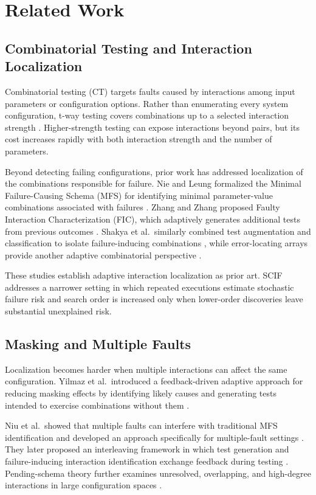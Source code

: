 \section{Related Work}

\subsection{Combinatorial Testing and Interaction Localization}

Combinatorial testing (CT) targets faults caused by interactions among input parameters or configuration options. Rather than enumerating every system configuration, t-way testing covers combinations up to a selected interaction strength \cite{kuhn2008beyond, nie2011survey}. Higher-strength testing can expose interactions beyond pairs, but its cost increases rapidly with both interaction strength and the number of parameters.

Beyond detecting failing configurations, prior work has addressed localization of the combinations responsible for failure. Nie and Leung formalized the Minimal Failure-Causing Schema (MFS) for identifying minimal parameter-value combinations associated with failures \cite{nie2011mfs}. Zhang and Zhang proposed Faulty Interaction Characterization (FIC), which adaptively generates additional tests from previous outcomes \cite{zhang2011fic}. Shakya et al.~similarly combined test augmentation and classification to isolate failure-inducing combinations \cite{shakya2012isolating}, while error-locating arrays provide another adaptive combinatorial perspective \cite{martinez2009ela}.

These studies establish adaptive interaction localization as prior art. SCIF addresses a narrower setting in which repeated executions estimate stochastic failure risk and search order is increased only when lower-order discoveries leave substantial unexplained risk.

\subsection{Masking and Multiple Faults}

Localization becomes harder when multiple interactions can affect the same configuration. Yilmaz et al.~introduced a feedback-driven adaptive approach for reducing masking effects by identifying likely causes and generating tests intended to exercise combinations without them \cite{yilmaz2014masking}.

Niu et al.~showed that multiple faults can interfere with traditional MFS identification and developed an approach specifically for multiple-fault settings \cite{niu2020multiple}. They later proposed an interleaving framework in which test generation and failure-inducing interaction identification exchange feedback during testing \cite{niu2020interleaving}. Pending-schema theory further examines unresolved, overlapping, and high-degree interactions in large configuration spaces \cite{niu2022pending}.

